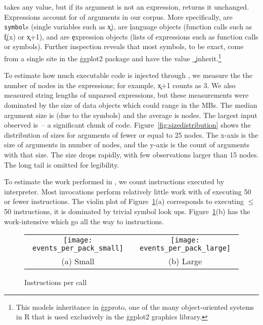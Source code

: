 \documentclass[screen,acmsmall]{acmart}
\begin{document}
\Eval takes any value, but if its argument is not an expression, \eval returns
it unchanged. Expressions account for \packageCodepercent of arguments in our
corpus. More specifically, \packageSymbolpercent are \texttt{symbol}s (single
variables such as \c{x}), \packageLanguagepercent are \c{language} objects
(function calls such as \c{f(x)} or \c{x+1}), and \packageExpressionpercent are
\c{expression} objects (lists of expressions such as function calls or
symbols). Further inspection reveals that most symbols,
\packageGgplotsymbolpercent to be exact, come from a single site in the
\c{ggplot2} package and have the value \c{\_inherit}.\footnote{This models
inheritance in \c{ggproto}, one of the many object-oriented systems in
R that is used exclusively in the \c{ggplot2} graphics library.}

To estimate how much executable code is injected through \eval, we measure the
the number of nodes in the expressions; for example, \c{x+1} counts as 3. We
also measured string lengths of unparsed expressions, but these measurements
were dominated by the size of data objects which could range in the MBs. The
median argument size is \packageMedianszeval (due to the symbols) and the
average is \packageAvgszeval nodes. The largest \eval input observed is
\packageMaxszeval\,-- a significant chunk of code.
Figure~\ref{fig:sizedistribution} shows the distribution of sizes for arguments
of fewer or equal to 25 nodes. The x-axis is the size of arguments in number of
nodes, and the y-axis is the count of arguments with that size. The size drops
rapidly, with few observations larger than 15 nodes. The long tail is omitted
for legibility.

To estimate the work performed in \evals, we count instructions executed by
interpreter. Most invocations perform relatively little work with
\packageSmalleventspct of \evals executing 50 or fewer instructions. The violin
plot of Figure~\ref{ev}(a) corresponds to \evals executing $\leq$ 50
instructions, it is dominated by trivial symbol look ups. Figure~\ref{ev}(b) has
the work-intensive \evals which go all the way to \packageMaxeventsRnd
instructions.

\newpage

\begin{figure}[tb!]
\begin{tabular}{@{}c@{}c@{}}
\begin{minipage}{7.5cm}
 \texttt{[image: events\_per\_pack\_small]}
\end{minipage}&\begin{minipage}{7.5cm}
  \texttt{[image: events\_per\_pack\_large]}
\end{minipage}\\[-3mm]
\small (a) Small & \small (b) Large
\end{tabular}
 \caption{Instructions per call} \label{ev}
\end{figure}
\end{document}
